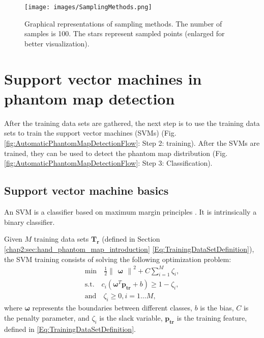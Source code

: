 \begin{figure}[ht]
    \centering
    \texttt{[image: images/SamplingMethods.png]}
    \caption{Graphical representations of sampling methods. The number of samples is 100. The stars represent sampled points (enlarged for better visualization). }
    \label{Fig:Sampling_methods}
\end{figure}



\section{Support vector machines in phantom map detection}
\label{chap2:sec:support_vector_machines_in_phantom_map_detection}
After the training data sets are gathered, the next step is to use the training data sets to train the support vector machines (SVMs) (Fig. \ref{fig:AutomaticPhantomMapDetectionFlow}: Step 2: training). After the SVMs are trained, they can be used to detect the phantom map distribution (Fig. \ref{fig:AutomaticPhantomMapDetectionFlow}: Step 3: Classification).

\subsection{Support vector machine basics}
\label{chap2:subsec:supoort_vector_machine_basics}
An SVM is a classifier based on maximum margin principles \cite{bartlett1999generalization}. It is intrinsically a binary classifier. 

Given $M$ training data sets $ \mathbf{T_r}$ (defined in Section \ref{chap2:sec:hand_phantom_map_introduction} \eqref{Eq:TrainingDataSetDefinition}), the SVM training consists of solving the following optimization problem:
\begin{equation}
\label{Eq:dualSVM}
  \begin{aligned}
   \text{min}   \quad   \frac{1}{2} \begin{Vmatrix} \boldsymbol{ \omega}   \end{Vmatrix} ^2 + C \sum_{i=1}^{M} \zeta_{i}, \\
    \text{s.t.}   \quad   c_i(\boldsymbol{\omega} ^T\boldsymbol{ p_{\text{tr}}} + b) \geq 1 -\zeta_i,   \\
     \text{and}  \quad      \zeta _i \geq 0, i = 1 \dots M,
    \end{aligned}
\end{equation}
where $\boldsymbol{\omega}$ represents the boundaries between different classes, $b$ is the bias, $C$ is the penalty parameter, and $\zeta_i$ is the slack variable, $\boldsymbol{ p_{\text{tr}}}$ is the training feature, defined in \eqref{Eq:TrainingDataSetDefinition}.

